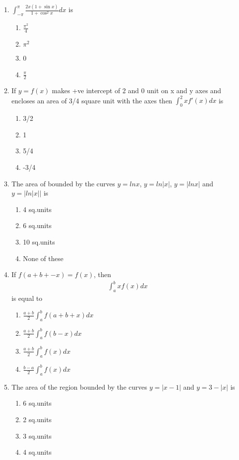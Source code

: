 \begin{enumerate}[label=\arabic*.,ref=\thesubsection.\theenumi]
\item $\int_{-\pi}^{\pi}\frac{2x(1 + \sin x)}{1 + \cos^{2}x}dx$ is
\begin{enumerate}
\item $\frac{\pi^{2}}{4}$
\item $\pi^{2}$
\item 0
\item $\frac{\pi}{2}$
\end{enumerate}  

\item If $y = f(x)$ makes +ve intercept of 2 and 0 unit on x and y axes and encloses an area of 3/4 square unit with the axes then $\int_{0}^{2}xf'(x)dx$ is
\begin{enumerate}
\item 3/2
\item 1
\item 5/4
\item -3/4
\end{enumerate}

\item The area of bounded by the curves $y  = lnx $, $y = ln|x|$, $y = |ln x|$ and $y = |ln|x||$ is
\begin{enumerate}
\item 4 sq.units
\item 6 sq.units
\item 10 sq.units
\item None of these
\end{enumerate}

\item If $f(a + b + -x) = f(x)$, then 
\begin{align*}
\int_{a}^{b}xf(x)dx
\end{align*}
is equal to
\begin{enumerate}
\item $\frac{a + b}{2}\int_{a}^{b}f(a + b + x)dx$
\item $\frac{a + b}{2}\int_{a}^{b}f(b - x)dx$
\item $\frac{a + b}{2}\int_{a}^{b}f(x)dx$
\item $\frac{b - a}{2}\int_{a}^{b}f(x)dx$
\end{enumerate}

\item The area of the region bounded by the curves $y = |x - 1|$ and $y = 3 - |x|$ is
\begin{enumerate}
\item 6 sq.units
\item 2 sq.units
\item 3 sq.units
\item 4 sq.units
\end{enumerate}


\end{enumerate}
